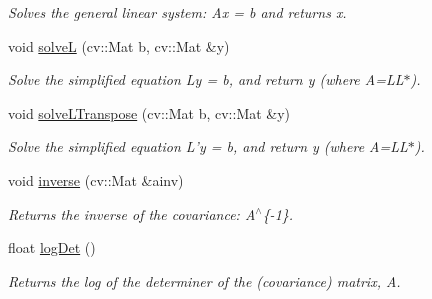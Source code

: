 \begin{DoxyCompactItemize}
\begin{DoxyCompactList}\small\item\em Solves the general linear system: Ax = b and returns x. \item\end{DoxyCompactList}\item 
\hypertarget{classcholesky_afab448cc0199f85d56fed0fe6fcc806c}{
void \hyperlink{classcholesky_afab448cc0199f85d56fed0fe6fcc806c}{solveL} (cv::Mat b, cv::Mat \&y)}
\label{classcholesky_afab448cc0199f85d56fed0fe6fcc806c}

\begin{DoxyCompactList}\small\item\em Solve the simplified equation Ly = b, and return y (where A=LL$\ast$). \item\end{DoxyCompactList}\item 
\hypertarget{classcholesky_ac63c2300b53788f64d01ea35113b89a1}{
void \hyperlink{classcholesky_ac63c2300b53788f64d01ea35113b89a1}{solveLTranspose} (cv::Mat b, cv::Mat \&y)}
\label{classcholesky_ac63c2300b53788f64d01ea35113b89a1}

\begin{DoxyCompactList}\small\item\em Solve the simplified equation L'y = b, and return y (where A=LL$\ast$). \item\end{DoxyCompactList}\item 
\hypertarget{classcholesky_adb47981d6d8bd86a3b8306a55e0e1333}{
void \hyperlink{classcholesky_adb47981d6d8bd86a3b8306a55e0e1333}{inverse} (cv::Mat \&ainv)}
\label{classcholesky_adb47981d6d8bd86a3b8306a55e0e1333}

\begin{DoxyCompactList}\small\item\em Returns the inverse of the covariance: A$^\wedge$\{-\/1\}. \item\end{DoxyCompactList}\item 
\hypertarget{classcholesky_a5e3cbcf3362cc79dcbcbabec4815987a}{
float \hyperlink{classcholesky_a5e3cbcf3362cc79dcbcbabec4815987a}{logDet} ()}
\label{classcholesky_a5e3cbcf3362cc79dcbcbabec4815987a}

\begin{DoxyCompactList}\small\item\em Returns the log of the determiner of the (covariance) matrix, A. \item\end{DoxyCompactList}\end{DoxyCompactItemize}
